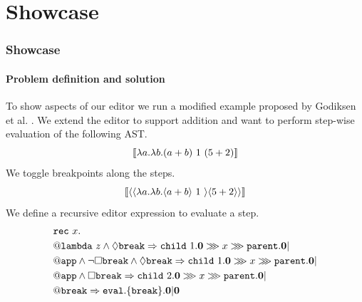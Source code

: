 \section{Showcase}
\begin{frame}
    \frametitle{Showcase}
    \framesubtitle{Problem definition and solution}
    To show aspects of our editor we run a modified example proposed by Godiksen et al.
    \pepm. We extend the editor to support addition and want to perform
    step-wise evaluation of the following AST.
    \begin{equation}
        \llbracket \lambda a.\lambda b.(a + b)~1~(5 + 2) \rrbracket
    \end{equation}
    \pause
    We toggle breakpoints along the steps.
    \begin{equation}
        \llbracket \langle \langle \lambda a.\lambda b.\langle a + b \rangle~1~\rangle{\langle 5 + 2 \rangle} \rangle \rrbracket
    \end{equation}
    \pause
    We define a recursive editor expression to evaluate a step.
    \small{
        \begin{align}
             & \rec{x}{                                                                                                                                                                          \\
             & \bicond{\conjunction{\at{\aamLambda{z}}}{\possibly{\aamBreak}}}{\seqcomp{\pre{\child{1}}{\nil}}{\seqcomp{\call{x}}{\pre{\parent}{\nil}}}}{                                        \\
             & \bicond{\conjunction{\at{\aamApp}}{\conjunction{\neg{\necessarily{\aamBreak}}}{\possibly{\aamBreak}}}}{\seqcomp{\pre{\child{1}}{\nil}}{\seqcomp{\call{x}}{\pre{\parent}{\nil}}}}{ \\
             & \bicond{\conjunction{\at{\aamApp}}{\necessarily{\aamBreak}}}{\seqcomp{\pre{\child{2}}{\nil}}{\seqcomp{\call{x}}{\pre{\parent}{\nil}}}}{                                           \\
             & \bicond{\at{\aamBreak}}{\pre{\eval}{\pre{\sub{\aamBreak}}}{\nil}}{\nil}
                        }
                    }
                }
            }
        \end{align}
    }
\end{frame}

